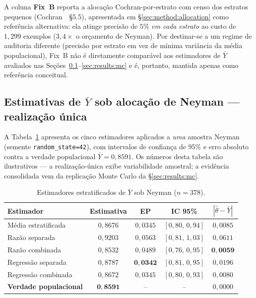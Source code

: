 A coluna \textbf{Fix~B} reporta a alocação Cochran-por-estrato com censo dos
estratos pequenos (Cochran~\cite{cochran1977}~§5.5), apresentada em
\S\ref{sec:method:allocation} como referência alternativa: ela atinge precisão
de $5\%$ \textit{em cada estrato} ao custo de $1{,}299$ exemplos
($3{,}4\times$ o orçamento de Neyman). Por destinar-se a um regime de
auditoria diferente (precisão por estrato em vez de mínima variância da média
populacional), Fix~B não é diretamente comparável aos estimadores de
$\bar{Y}$ avaliados nas Seções~\ref{sec:results:single}--\ref{sec:results:mc}
e é, portanto, mantida apenas como referência conceitual.

\subsection{Estimativas de $\bar{Y}$ sob alocação de Neyman --- realização única}
\label{sec:results:single}

A Tabela~\ref{tab:estimators} apresenta os cinco estimadores aplicados a
\emph{uma} amostra Neyman (semente \texttt{random\_state=42}), com intervalos
de confiança de $95\%$ e erro absoluto contra a verdade populacional
$\bar{Y}=0{,}8591$. Os números desta tabela são ilustrativos --- a
realização-única exibe variabilidade amostral; a evidência consolidada vem da
replicação Monte Carlo da \S\ref{sec:results:mc}.

\begin{table}[!t]
\centering
\small
\setlength{\tabcolsep}{3pt}
\caption{Estimadores estratificados de $\bar{Y}$ sob Neyman ($n=378$).}
\label{tab:estimators}
\begin{tabular}{lcccc}
\toprule
Estimador                    & Estimativa & EP    & IC 95\%             & $|\hat\theta - \bar{Y}|$ \\
\midrule
Média estratificada           & $0{,}8676$ & $0{,}0345$ & $[0{,}80,\,0{,}94]$ & $0{,}0085$ \\
Razão separada                & $0{,}9203$ & $0{,}0563$ & $[0{,}81,\,1{,}03]$ & $0{,}0611$ \\
Razão combinada               & $0{,}8532$ & $0{,}0489$ & $[0{,}76,\,0{,}95]$ & $\mathbf{0{,}0059}$ \\
Regressão separada            & $0{,}8787$ & $\mathbf{0{,}0342}$ & $[0{,}81,\,0{,}95]$ & $0{,}0196$ \\
Regressão combinada           & $0{,}8672$ & $0{,}0345$ & $[0{,}80,\,0{,}93]$ & $0{,}0080$ \\
\midrule
\textbf{Verdade populacional} & $\mathbf{0{,}8591}$ & --      & --                  & $0{,}0000$ \\
\bottomrule
\end{tabular}
\end{table}

